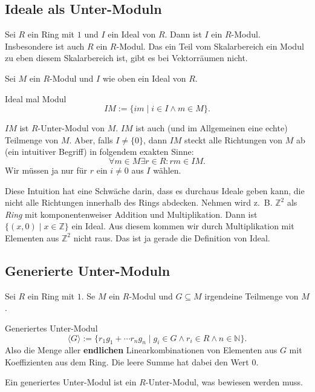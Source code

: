 \documentclass[a4paper]{amsart}
\theoremstyle{definition}
\newcommand{\Z}{\ensuremath{\mathbb{ Z }}}
\newcommand{\N}{\ensuremath{\mathbb{ N }}}
\newcommand{\zb}{z.~B. }
\begin{document}
\subsection{Ideale als Unter-Moduln}
Sei $R$ ein Ring mit $1$ und $I$ ein Ideal von $R$. Dann ist $I$ ein $R$-Modul. Insbesondere ist auch $R$ ein $R$-Modul. Das ein Teil vom Skalarbereich ein Modul zu eben diesem Skalarbereich ist, gibt es bei Vektorräumen nicht.

Sei $M$ ein $R$-Modul und $I$ wie oben ein Ideal von $R$. 
\begin{Definition}{Ideal mal Modul}
   \begin{equation}\label{IdealMalModul}
      IM := \{ im \mid i \in I \land m \in M\}.
   \end{equation}
\end{Definition}
$IM$ ist $R$-Unter-Modul von  $M$. $IM$ ist auch (und im Allgemeinen eine echte) Teilmenge von $M$. Aber, falls $I \ne \{0\}$, dann $IM$ steckt alle Richtungen von $M$ ab (ein intuitiver Begriff) in folgendem exakten Sinne:
\begin{equation}\label{abstecken}
   \forall m \in M \exists r  \in R \colon rm \in IM.
\end{equation} 
Wir müssen ja nur für $r$ ein $i \ne 0$ aus $I$ wählen.

Diese Intuition hat eine Schwäche darin, dass es durchaus Ideale geben kann, die nicht alle Richtungen innerhalb des Rings abdecken. Nehmen wird \zb $\Z^2$ als  \emph{Ring} mit komponentenweiser Addition und Multiplikation. Dann ist $\{ (x, 0) \mid x \in \Z \}$ ein Ideal. Aus diesem kommen wir durch Multiplikation mit Elementen aus $\Z^2$ nicht raus. Das ist ja gerade die Definition von Ideal.

\subsection{Generierte Unter-Moduln}
Sei $R$ ein Ring mit $1$. Se $M$ ein $R$-Modul und $G \subseteq M$ irgendeine Teilmenge von $M$.
\begin{Definition}{Generiertes Unter-Modul}
   \begin{equation}\label{GeneriertesUnterModul}
      \langle G \rangle := \{ r_1g_1 +  \cdots r_ng_n \mid g_i \in G \land r_i \in R \land n \in \N \}.
   \end{equation}
   Also die Menge aller \textbf{endlichen} Linearkombinationen von Elementen aus $G$ mit Koeffizienten aus dem Ring. Die leere Summe hat dabei den Wert $0$. 
\end{Definition}
Ein generiertes Unter-Modul ist ein $R$-Unter-Modul, was bewiesen werden muss.
\end{document}
